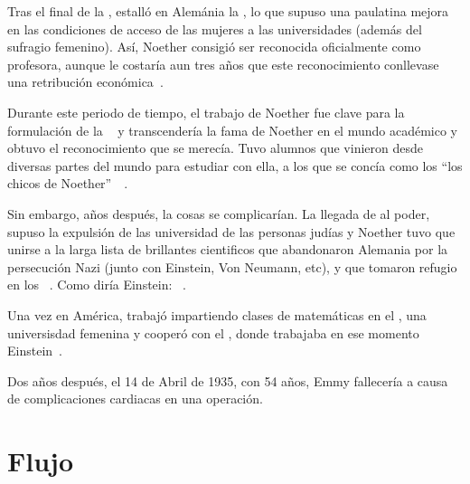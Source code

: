 Tras el final de la , estalló en Alemánia la , lo que supuso una paulatina mejora en las condiciones de acceso de las mujeres a las universidades (además del sufragio femenino).
Así, Noether consigió ser reconocida oficialmente como profesora, aunque le costaría aun tres años que este reconocimiento conllevase una retribución económica~\autocite[333]{Carrasco}.

Durante este periodo de tiempo, el trabajo de Noether fue clave para la formulación de la ~\autocite{Weyl} y transcendería la fama de Noether en el mundo académico y obtuvo el reconocimiento que se merecía.
Tuvo alumnos que vinieron desde diversas partes del mundo para estudiar con ella, a los que se concía como los \textquotedblleft los chicos de Noether\textquotedblright\ ~\autocite{Carrasco}.

Sin embargo, años después, la cosas se complicarían.
La llegada de  al poder, supuso la expulsión de las universidad de las personas judías y Noether tuvo que unirse a la larga lista de brillantes cientificos que abandonaron Alemania por la persecución Nazi (junto con Einstein, Von Neumann, etc), y que tomaron refugio en los ~\autocite{Kimberling}.
Como diría Einstein: ~\autocite{Einstein}.

Una vez en América, trabajó impartiendo clases de matemáticas en el , una universisdad femenina y cooperó con el , donde trabajaba en ese momento Einstein~\autocite{Carrasco}.

Dos años después, el 14 de Abril de 1935, con 54 años, Emmy fallecería a causa de complicaciones cardiacas en una operación.

\section{Flujo}\label{sec:flujo}

